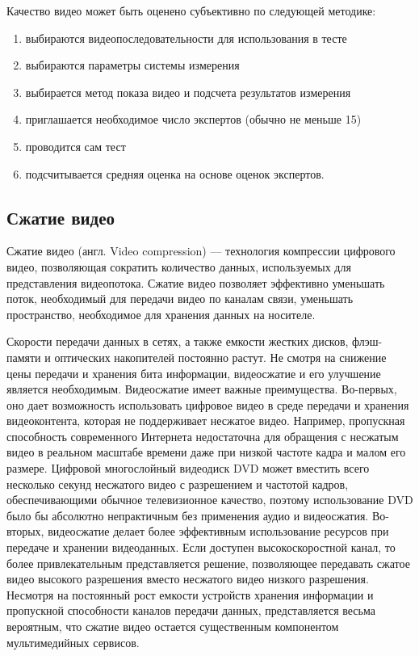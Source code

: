 \begin{itemize}
Качество видео может быть оценено субъективно по следующей методике:

\begin{enumerate}
\item выбираются видеопоследовательности для использования в тесте
\item выбираются параметры системы измерения
\item выбирается метод показа видео и подсчета результатов измерения
\item приглашается необходимое число экспертов (обычно не меньше 15)
\item проводится сам тест
\item подсчитывается средняя оценка на основе оценок экспертов.
\end{enumerate}

\end{itemize}

\subsection{Сжатие видео}

Сжатие видео (англ. Video compression) — технология компрессии цифрового видео, 
позволяющая сократить количество данных, используемых для представления видеопотока. 
Сжатие видео позволяет эффективно уменьшать поток, необходимый для передачи 
видео по каналам связи, уменьшать пространство, необходимое для хранения данных на носителе. 

Скорости передачи данных в сетях, а также емкости жестких дисков,
флэш-памяти и оптических накопителей постоянно растут. Не смотря на
снижение цены передачи и хранения бита информации, видеосжатие и его улучшение является необходимым.
Видеосжатие имеет важные преимущества. Во-первых, оно дает возможность
использовать цифровое видео в среде передачи и хранения видеоконтента,
которая не поддерживает несжатое видео. Например, пропускная
способность современного Интернета недостаточна для обращения с несжатым
видео в реальном масштабе времени даже при низкой частоте кадра и малом его
размере. Цифровой многослойный видеодиск DVD может вместить всего
несколько секунд несжатого видео с разрешением и частотой кадров,
обеспечивающими обычное телевизионное качество, поэтому использование
DVD было бы абсолютно непрактичным без применения аудио и видеосжатия.
Во-вторых, видеосжатие делает более эффективным использование ресурсов
при передаче и хранении видеоданных. Если доступен высокоскоростной
канал, то более привлекательным представляется решение, позволяющее
передавать сжатое видео высокого разрешения вместо несжатого видео
низкого разрешения. Несмотря на постоянный рост емкости устройств
хранения информации и пропускной способности каналов передачи данных,
представляется весьма вероятным, что сжатие видео остается
существенным компонентом мультимедийных сервисов.

